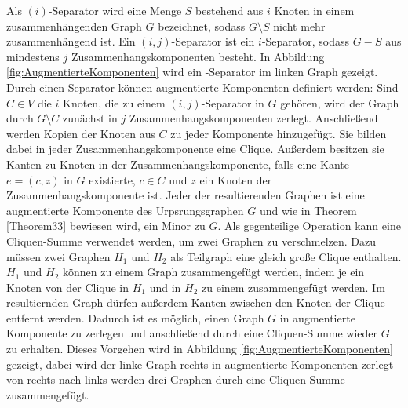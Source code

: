 Als $(i)$-Separator wird eine Menge $S$ bestehend aus $i$ Knoten in einem zusammenhängenden Graph $G$ bezeichnet, sodass $G \setminus S$ nicht mehr zusammenhängend ist.
Ein $(i, j)$-Separator ist ein $i$-Separator, sodass $G-S$ aus mindestens $j$ Zusammenhangskomponenten besteht.
In Abbildung \ref{fig:AugmentierteKomponenten} wird ein \dd-Separator im linken Graph gezeigt.
Durch einen Separator können augmentierte Komponenten definiert werden:
Sind $C \in V$ die $i$ Knoten, die zu einem $(i, j)$-Separator in $G$ gehören, wird der Graph durch $G \setminus C$ zunächst in $j$ Zusammenhangskomponenten zerlegt.
Anschließend werden Kopien der Knoten aus $C$ zu jeder Komponente hinzugefügt.
Sie bilden dabei in jeder Zusammenhangskomponente eine Clique.
Außerdem besitzen sie Kanten zu Knoten in der Zusammenhangskomponente, falls eine Kante $e = (c, z)$ in $G$ existierte, $c \in C$ und $z$ ein Knoten der Zusammenhangskomponente ist.
Jeder der resultierenden Graphen ist eine augmentierte Komponente des Urpsrungsgraphen $G$ und wie in Theorem \ref{Theorem33} bewiesen wird, \evtl ein Minor zu $G$.
Als gegenteilige Operation kann eine Cliquen-Summe verwendet werden, um zwei Graphen zu verschmelzen.
Dazu müssen zwei Graphen $H_1$ und $H_2$ als Teilgraph eine gleich große Clique enthalten.
$H_1$ und $H_2$ können zu einem Graph zusammengefügt werden, indem je ein Knoten von der Clique in $H_1$ und in $H_2$ zu einem zusammengefügt werden.
Im resultiernden Graph dürfen außerdem Kanten zwischen den Knoten der Clique entfernt werden.
Dadurch ist es möglich, einen Graph $G$ in augmentierte Komponente zu zerlegen und anschließend durch eine Cliquen-Summe wieder $G$ zu erhalten.
Dieses Vorgehen wird in Abbildung \ref{fig:AugmentierteKomponenten} gezeigt, dabei wird der linke Graph rechts in augmentierte Komponenten zerlegt \bzw von rechts nach links werden drei Graphen durch eine Cliquen-Summe zusammengefügt.
